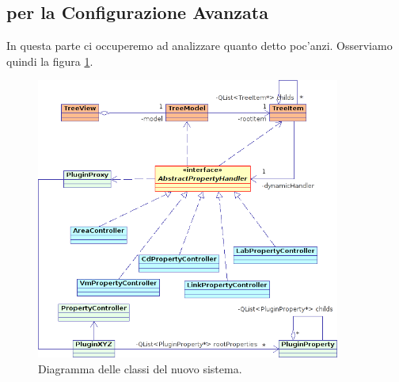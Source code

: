 \subsection{\plugin{} per la Configurazione Avanzata}
In questa parte ci occuperemo ad analizzare quanto detto poc'anzi. Osserviamo quindi la figura \ref{figura:properties_uml1}.

\begin{figure}[!htb]
	\centering
	\includegraphics[width=10cm]{images/properties_uml1.png}
	\caption{Diagramma delle classi del nuovo sistema.}
	\label{figura:properties_uml1}
\end{figure}


